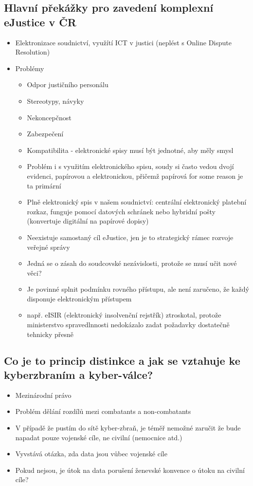 \subsection{Hlavní překážky pro zavedení komplexní eJustice v ČR}
\begin{itemize}
    \item Elektronizace soudnictví, využítí ICT v justici (neplést s Online Dispute Resolution)
    \item Problémy
    \begin{itemize}
        \item Odpor justičního personálu
        \item Stereotypy, návyky
        \item Nekoncepčnost
        \item Zabezpečení
        \item Kompatibilita - elektronické spisy musí být jednotné, aby měly smysl
        \item Problém i s využitím elektronického spisu, soudy si často vedou dvojí evidenci, papírovou a elektronickou, přičemž papírová for some reason je ta primární
        \item Plně elektronický spis v našem soudnictví: centrální elektronický platební rozkaz, funguje pomocí datových schránek nebo hybridní pošty (konvertuje digitální na papírové dopisy)
        \item Neexistuje samostaný cíl eJustice, jen je to strategický rámec rozvoje veřejné správy
        \item Jedná se o zásah do soudcovské nezávislosti, protože se musí učit nové věci?
        \item Je povinné splnit podmínku rovného přístupu, ale není zaručeno, že každý disponuje elektronickým přístupem
        \item např. eISIR (elektronický insolvenční rejstřík) ztroskotal, protože ministerstvo spravedlnnosti nedokázalo zadat požadavky dostatečně tehnicky přesně
    \end{itemize}
\end{itemize}

\subsection{Co je to princip distinkce a jak se vztahuje ke kyberzbraním a kyber-válce?}
\begin{itemize}
    \item Mezinárodní právo
    \item Problém dělání rozdílů mezi combatants a non-combatants
    \item V případě že pustím do sítě kyber-zbraň, je téměř nemožné zaručit že bude napadat pouze vojenské cíle, ne civilní (nemocnice atd.)
    \item Vyvstává otázka, zda data jsou vůbec vojenské cíle
    \item Pokud nejsou, je útok na data porušení ženevské konvence o útoku na civilní cíle?
    
\end{itemize}